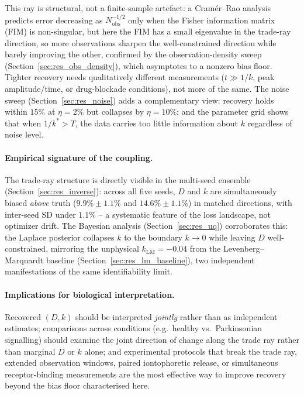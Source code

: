 \documentclass[pdflatex,sn-basic,Numbered]{sn-jnl}
\theoremstyle{thmstyleone}
\theoremstyle{thmstyletwo}
\begin{document}
This ray is structural, not a finite-sample artefact: a
Cram\'er--Rao analysis predicts error decreasing as
$N_{\mathrm{obs}}^{-1/2}$ only when the Fisher information
matrix (FIM) is non-singular, but here the FIM has a small
eigenvalue in the trade-ray direction, so more observations
sharpen the well-constrained direction while barely improving
the other, confirmed by the observation-density sweep
(Section~\ref{sec:res_obs_density}), which asymptotes to a
nonzero bias floor. Tighter recovery needs qualitatively
different measurements ($t \gg 1/k$, peak amplitude/time, or
drug-blockade conditions), not more of the same. The noise sweep
(Section~\ref{sec:res_noise}) adds a complementary view: recovery
holds within $15\%$ at $\eta = 2\%$ but collapses by
$\eta = 10\%$; and the parameter grid shows that when
$1/k^* > T$, the data carries too little information about $k$
regardless of noise level.

\paragraph{Empirical signature of the coupling.}
\label{sec:lim_coupling}
The trade-ray structure is directly visible in the multi-seed
ensemble (Section~\ref{sec:res_inverse}): across all five seeds,
$D$ and $k$ are simultaneously biased \emph{above} truth
($9.9\% \pm 1.1\%$ and $14.6\% \pm 1.1\%$) in matched
directions, with inter-seed SD under $1.1\%$ -- a systematic
feature of the loss landscape, not optimizer drift. The Bayesian
analysis (Section~\ref{sec:res_uq}) corroborates this: the
Laplace posterior collapses $k$ to the boundary $k \to 0$ while
leaving $D$ well-constrained, mirroring the unphysical
$k_{\mathrm{LM}} = -0.04$ from the Levenberg--Marquardt baseline
(Section~\ref{sec:res_lm_baseline}), two independent
manifestations of the same identifiability limit.

\paragraph{Implications for biological interpretation.}
Recovered $(D, k)$ should be interpreted \emph{jointly} rather
than as independent estimates; comparisons across conditions
(e.g.\ healthy vs.\ Parkinsonian signalling) should examine the
joint direction of change along the trade ray rather than
marginal $D$ or $k$ alone; and experimental protocols that break
the trade ray, extended observation windows, paired
iontophoretic release, or simultaneous receptor-binding
measurements are the most effective way to improve recovery
beyond the bias floor characterised here.
\end{document}
